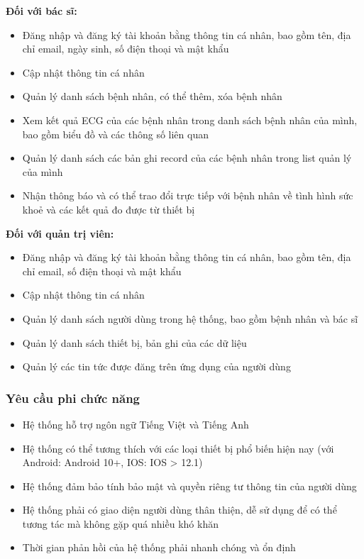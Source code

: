 \textbf{Đối với bác sĩ:}
\begin{adjustwidth}{1.5em}{}
\begin{itemize}
    \item Đăng nhập và đăng ký tài khoản bằng thông tin cá nhân, bao gồm tên, địa chỉ email, ngày sinh, số điện thoại và mật khẩu
    \item Cập nhật thông tin cá nhân
    \item Quản lý danh sách bệnh nhân, có thể thêm, xóa bệnh nhân
    \item Xem kết quả ECG của các bệnh nhân trong danh sách bệnh nhân của mình, bao gồm biểu đồ và các thông số liên quan
    \item Quản lý danh sách các bản ghi record của các bệnh nhân trong list quản lý của mình
    \item Nhận thông báo và có thể trao đổi trực tiếp với bệnh nhân về tình hình sức khoẻ và các kết quả đo được từ thiết bị
\end{itemize}
\end{adjustwidth}
\textbf{Đối với quản trị viên:}
\begin{adjustwidth}{1.5em}{}
\begin{itemize}
    \item Đăng nhập và đăng ký tài khoản bằng thông tin cá nhân, bao gồm tên, địa chỉ email, số điện thoại và mật khẩu
    \item Cập nhật thông tin cá nhân
    \item Quản lý danh sách người dùng trong hệ thống, bao gồm bệnh nhân và bác sĩ
    \item Quản lý danh sách thiết bị, bản ghi của các dữ liệu
    \item Quản lý các tin tức được đăng trên ứng dụng của người dùng
\end{itemize}
\end{adjustwidth}

\subsubsection{Yêu cầu phi chức năng}
\begin{itemize}
    \item Hệ thống hỗ trợ ngôn ngữ Tiếng Việt và Tiếng Anh
    \item Hệ thống có thể tương thích với các loại thiết bị phổ biến hiện nay (với Android: Android 10+, IOS: IOS > 12.1)
    \item Hệ thống đảm bảo tính bảo mật và quyền riêng tư thông tin của người dùng
    \item Hệ thống phải có giao diện người dùng thân thiện, dễ sử dụng để có thể tương tác mà không gặp quá nhiều khó khăn
    \item Thời gian phản hồi của hệ thống phải nhanh chóng và ổn định
\end{itemize}

